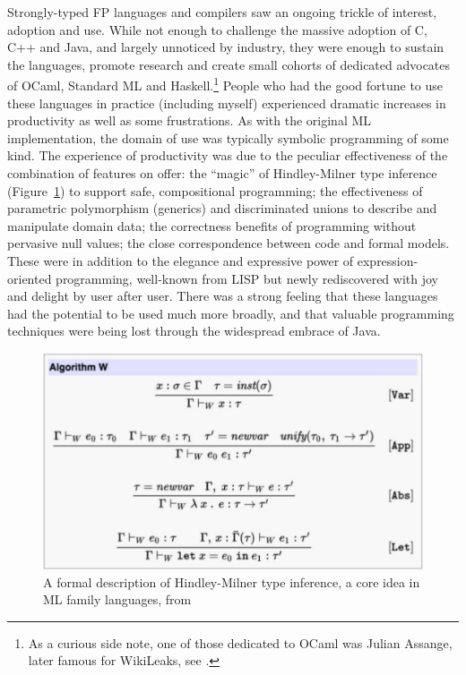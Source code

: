 \documentclass[acmsmall,screen]{acmart}
\begin{document}
Strongly-typed FP languages and compilers saw an ongoing trickle of interest, adoption and use. While not enough to challenge the massive adoption of C, C++ and Java,
and largely unnoticed by industry, they were enough to sustain the languages, promote research and create small cohorts of dedicated advocates of OCaml, Standard ML
and Haskell.\footnote{As a curious side note, one of those dedicated to OCaml was Julian Assange, later famous for WikiLeaks, see \citep{RefAssange}.}   People who had the good fortune to use these languages
in practice (including myself) experienced dramatic increases in productivity as well as some frustrations. As with the original ML implementation, the domain of use was
typically symbolic programming of some kind. The experience of productivity was due to the peculiar effectiveness of the combination of features on offer: the “magic”
of Hindley-Milner type inference (Figure~\ref{fig:hm}) to support safe, compositional programming; the effectiveness of parametric polymorphism (generics) and discriminated unions to describe
and manipulate domain data; the correctness benefits of programming without pervasive null values; the close correspondence between code and formal models. These were
in addition to the elegance and expressive power of expression-oriented programming, well-known from LISP but newly rediscovered with joy and delight by user after
user. There was a strong feeling that these languages had the potential to be used much more broadly, and that valuable programming techniques were being lost through
the widespread embrace of Java.  

\begin{figure}
  \begin{center}
  \includegraphics[width=0.9\linewidth]{hindley-milner.PNG}
  \end{center}
  \caption{A formal description of Hindley-Milner type inference, a core idea in ML family languages, from \citep{BlasucciFSharpHistory}}
  \label{fig:hm}
\end{figure}
\end{document}
